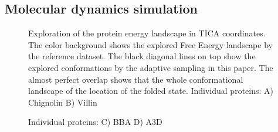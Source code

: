 \subsection{\label{sec:MD} Molecular dynamics simulation}

\begin{figure}[H]
   \begin{subfigure}[b]{0.6\linewidth}
   {}
   \end{subfigure}%
   
   \begin{subfigure}[b]{0.6\linewidth}
   {}
   \end{subfigure}%

  \caption{Exploration of the protein energy landscape in TICA coordinates. The
 color background shows the explored Free Energy landscape by the reference
 dataset. The black diagonal lines on top show the explored conformations by the adaptive
 sampling in this paper. The almost perfect overlap shows that the whole
 conformational landscape of  the location of the folded state. Individual proteins: A) Chignolin B) Villin }
\end{figure}

\begin{figure}[H]\ContinuedFloat

   
   \begin{subfigure}[b]{0.6\linewidth}
   {}
   \end{subfigure}%
  
   \begin{subfigure}[b]{0.6\linewidth}
   {}
   \end{subfigure}%

  \caption{ Individual proteins: C) BBA D) A3D} 
  \label{fig:overlap}
\end{figure}

